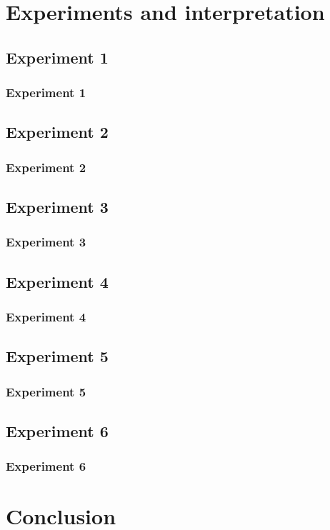 \documentclass{beamer}
\begin{document}
\section{Experiments and interpretation} 

\subsection{Experiment 1} 
\begin{frame}
\frametitle{Experiment 1}
\end{frame}


\subsection{Experiment 2}
\begin{frame}
\frametitle{Experiment 2}
\end{frame}

\subsection{Experiment 3}
\begin{frame}
\frametitle{Experiment 3}
\end{frame}

\subsection{Experiment 4}
\begin{frame}
\frametitle{Experiment 4}
\end{frame}

\subsection{Experiment 5}
\begin{frame}
\frametitle{Experiment 5}
\end{frame}

\subsection{Experiment 6}
\begin{frame}
\frametitle{Experiment 6}
\end{frame}
\section{Conclusion} 
\end{document}
